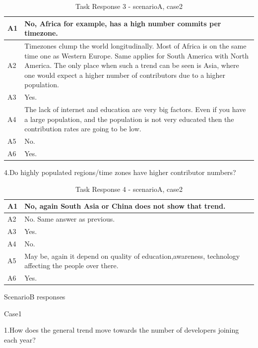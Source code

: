 \documentclass[seploa]{beavtex}
\begin{document}
\begin{table}[H]
\begin{tabular}{ |p{2cm}|p{12cm}| }
 \hline
 A1 & No, Africa for example, has a high number commits per timezone.\\
 \hline
 A2 & Timezones clump the world longitudinally. Most of Africa is on the same time one as Western Europe. Same applies for South America with North America. The only place when such a trend can be seen is Asia, where one would expect a higher number of contributors due to a higher population.\\ \hline
 A3 & Yes.\\ \hline
 A4 & The lack of internet and education are very big factors. Even if you have a large population, and the population is not very educated then the contribution rates are going to be low.\\ \hline
 A5 & No.\\ \hline
 A6 & Yes.\\
 \hline
\end{tabular}
\caption{Task Response 3 - scenarioA, case2}
\label{tab:table13}
\end{table}

4.Do highly populated regions/time zones have higher contributor numbers?

\begin{table}[H]
\begin{tabular}{ |p{2cm}|p{12cm}| }
 \hline
 A1 & No, again South Asia or China does not show that trend.\\
 \hline
 A2 & No. Same answer as previous.\\ \hline
 A3 & Yes.\\ \hline
 A4 & No.\\ \hline
 A5 & May be, again it depend on quality of education,awareness, technology affecting the people over there.\\ \hline
 A6 & Yes.\\
 \hline
\end{tabular}
\caption{Task Response 4 - scenarioA, case2}
\label{tab:table14}
\end{table}

ScenarioB responses

Case1

1.How does the general trend move towards the number of developers joining each year?	
\end{document}
